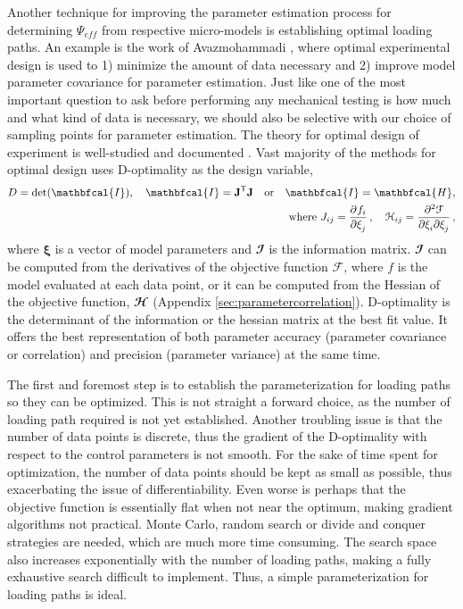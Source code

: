 	Another technique for improving the parameter estimation process for determining $\Psi_{eff}$ from respective micro-models is establishing optimal loading paths. An example is the work of Avazmohammadi \cite{avazmohammadi_novel_2017}, where optimal experimental design is used to 1) minimize the amount of data necessary and 2) improve model parameter covariance for parameter estimation. Just like one of the most important question to ask before performing any mechanical testing is how much and what kind of data is necessary, we should also be selective with our choice of sampling points for parameter estimation. The theory for optimal design of experiment is well-studied and documented \cite{lanir_optimal_1996, zhu_d_2014}. Vast majority of the methods for optimal design uses D-optimality as the design variable,
\begin{equation}\label{eqn:doptimality}
\begin{aligned}
D = \det(\mathbfcal{I}), \quad \mathbfcal{I} = \mathbf{J}^\mathsf{T}\mathbf{J} \quad \mathrm{or} \quad \mathbfcal{I} = \mathbfcal{H},	\\
\mathrm{where} \ J_{ij} = \dpd{f_i}{\xi_j}, \quad \mathcal{H}_{ij} = \dmd{\mathcal{F}}{2}{\xi_i}{}{\xi_j}{},
\end{aligned}
\end{equation}
    where $\mathbf{\xi}$ is a vector of model parameters and $\mathbfcal{I}$ is the information matrix. $\mathbfcal{I}$ can be computed from the derivatives of the objective function $\mathcal{F}$, where $f$ is the model evaluated at each data point, or it can be computed from the Hessian of the objective function, $\mathbfcal{H}$ (Appendix \ref{sec:parametercorrelation}). D-optimality is the determinant of the information or the hessian matrix at the best fit value. It offers the best representation of both parameter accuracy (parameter covariance or correlation) and precision (parameter variance) at the same time.

    
    The first and foremost step is to establish the parameterization for loading paths so they can be optimized. This is not straight a forward choice, as the number of loading path required is not yet established. Another troubling issue is that the number of data points is discrete, thus the gradient of the D-optimality with respect to the control parameters is not smooth. For the sake of time spent for optimization, the number of data points should be kept as small as possible, thus exacerbating the issue of differentiability. Even worse is perhaps that the objective function is essentially flat when not near the optimum, making gradient algorithms not practical. Monte Carlo, random search or divide and conquer strategies are needed, which are much more time consuming. The search space also increases exponentially with the number of loading paths, making a fully exhaustive search difficult to implement. Thus, a simple parameterization for loading paths is ideal. 
    

